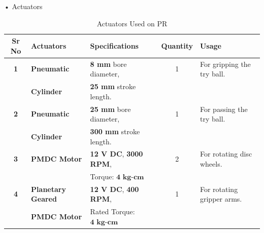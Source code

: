             • Actuators
            \begin{table}[h]
                \caption {Actuators Used on PR} \label{Actuators_PR}  \small
                \begin{tabular}{|c|l|l|c|l|}
                    \hline  \hline
                    \textbf{Sr No}  & \textbf{Actuators}        & \textbf{Specifications}               & \textbf{Quantity}  & \textbf{Usage}                                               \\ \hline   \hline
                    \textbf{1}      & \textbf{Pneumatic}        & \textbf{8 mm} bore diameter,          & 1                  & For gripping the try ball.                                    \\
                                    & \textbf{Cylinder}         & \textbf{25 mm} stroke length.         &                    &                                                              \\ \hline
                    \textbf{2}      & \textbf{Pneumatic}        & \textbf{25 mm} bore diameter,         & 1                  & For passing the try ball.                                    \\
                                    & \textbf{Cylinder}         & \textbf{300 mm} stroke length.        &                    &                                                              \\ \hline                                  
                    \textbf{3}      & \textbf{PMDC Motor}       & \textbf{12 V DC},  \textbf{3000 RPM}, & 2                  & For rotating disc wheels.                                     \\
                                    &                           & Torque: $\textbf{4 kg-cm}$            &                    &                                                              \\ \hline 
                    \textbf{4}      & \textbf{Planetary Geared} & \textbf{12 V DC},  \textbf{400 RPM},  & 1                  & For rotating gripper arms.                                    \\
                                    & \textbf{PMDC Motor}       & Rated Torque: $\textbf{4 kg-cm}$      &                    &                                                              \\ \hline   \hline   
                \end{tabular}
            \end{table}

